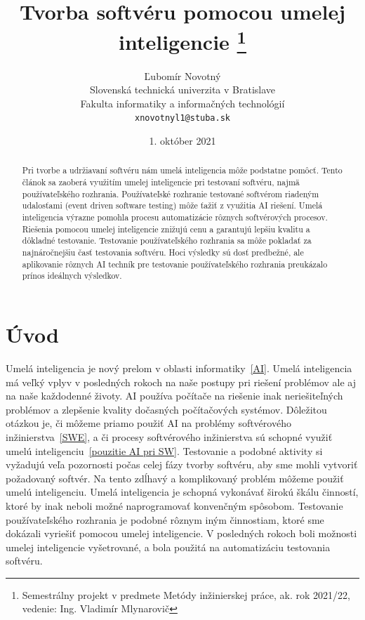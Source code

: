 \documentclass[10pt,twoside,slovak,a4paper]{article}
\title{Tvorba softvéru pomocou umelej inteligencie
\thanks{Semestrálny projekt v predmete Metódy inžinierskej práce, ak. rok 2021/22, vedenie: Ing. Vladimír Mlynarovič}} %
\author{Ľubomír Novotný\\[2pt]
	{\small Slovenská technická univerzita v Bratislave}\\
	{\small Fakulta informatiky a informačných technológií}\\
	{\small \texttt{xnovotnyl1@stuba.sk}}
	}
\date{\small 1. október 2021} %
\begin{document}
\maketitle

\begin{abstract}

Pri tvorbe a udržiavaní softvéru nám umelá inteligencia môže podstatne pomôcť. Tento článok sa zaoberá využitím umelej inteligencie pri testovaní softvéru, najmä používateľského rozhrania. Používateľské rozhranie testované softvérom riadeným udalosťami (event driven software testing) môže ťažiť z využitia AI riešení. Umelá inteligencia výrazne pomohla procesu automatizácie rôznych softvérových procesov. Riešenia pomocou umelej inteligencie znižujú cenu a garantujú lepšiu kvalitu a dôkladné testovanie. Testovanie používateľského rozhrania sa môže pokladať za najnáročnejšiu časť testovania softvéru. Hoci výsledky sú dosť predbežné, ale aplikovanie rôznych AI techník pre testovanie používateľského rozhrania preukázalo prínos ideálnych výsledkov.
\end{abstract}

\section{Úvod}

Umelá inteligencia je nový prelom v oblasti informatiky~\ref{AI}. Umelá inteligencia má veľký vplyv v posledných rokoch na naše postupy pri riešení problémov ale aj na naše každodenné životy. AI používa počítače na riešenie inak neriešiteľných problémov a zlepšenie kvality dočasných počítačových systémov. Dôležitou otázkou je, či môžeme priamo použiť AI na problémy softvérového inžinierstva~\ref{SWE}, a či procesy softvérového inžinierstva sú schopné využiť umelú inteligenciu~\ref{pouzitie AI pri SW}.
Testovanie a podobné aktivity si vyžadujú veľa pozornosti počas celej fázy tvorby softvéru, aby sme mohli vytvoriť požadovaný softvér. Na tento zdĺhavý a komplikovaný problém môžeme použiť umelú inteligenciu.  Umelá inteligencia je schopná vykonávať širokú škálu činností, ktoré by inak neboli možné naprogramovať konvenčným spôsobom. Testovanie používateľského rozhrania je podobné rôznym iným činnostiam, ktoré sme dokázali vyriešiť pomocou umelej inteligencie. V posledných rokoch boli možnosti umelej inteligencie vyšetrované, a bola použitá na automatizáciu testovania softvéru.
\end{document}
